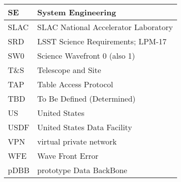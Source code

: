 \begin{longtable}{p{}p{}}
SE & System Engineering \\\hline
SLAC & SLAC National Accelerator Laboratory \\\hline
SRD & LSST Science Requirements; LPM-17 \\\hline
SW0 & Science Wavefront 0 (also 1) \\\hline
T\&S & Telescope and Site \\\hline
TAP & Table Access Protocol \\\hline
TBD & To Be Defined (Determined) \\\hline
US & United States \\\hline
USDF & United States Data Facility \\\hline
VPN & virtual private network \\\hline
WFE & Wave Front Error \\\hline
pDBB & prototype Data BackBone \\\hline
\end{longtable}
